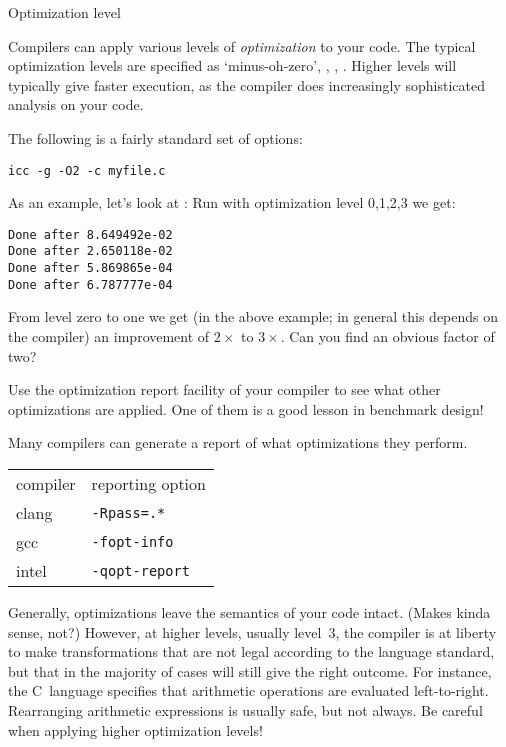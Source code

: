  {Optimization level}

Compilers can apply various levels of
\emph{optimization} to your code. The
typical optimization levels are specified as  `minus-oh-zero',
, , . Higher levels will typically give faster
execution, as the compiler does increasingly sophisticated analysis on
your code.

The following is a fairly standard set of options:
\begin{verbatim}
icc -g -O2 -c myfile.c
\end{verbatim}

As an example, let's look at :
Run with optimization level 0,1,2,3 we get:
\begin{verbatim}
Done after 8.649492e-02
Done after 2.650118e-02
Done after 5.869865e-04
Done after 6.787777e-04
\end{verbatim}
\begin{exercise}
  \label{ex:givens-optimize}
  From level zero to one we get (in the above example;
  in general this depends on the compiler) an improvement
  of $2\times$ to $3\times$. Can you find an obvious factor of two?

  Use the optimization report facility of your compiler to see what
  other optimizations are applied. One of them is a good lesson in
  benchmark design!
\end{exercise}

Many compilers can generate a report of what optimizations they perform.

\begin{tabular}{ll}
  compiler&reporting option\\
  clang& \texttt{-Rpass=.*}\\
  gcc&   \texttt{-fopt-info}\\
  intel& \texttt{-qopt-report}\\
\end{tabular}

Generally, optimizations leave the semantics of your code
intact. (Makes kinda sense, not?)  However, at higher levels,
usually level~3, the compiler is
at liberty to make transformations that are not legal
according to the language standard, but that in the majority of cases
will still give the right outcome. For instance, the C~language
specifies that arithmetic operations are evaluated left-to-right.
Rearranging arithmetic expressions is usually safe, but not always.
Be careful when applying higher optimization levels!

